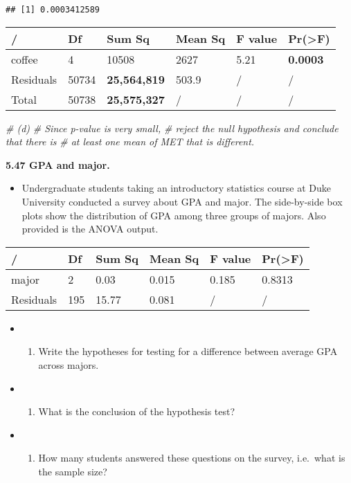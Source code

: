 \documentclass[]{book}
\newenvironment{Shaded}{\begin{snugshade}}{\end{snugshade}}
\newcommand{\CommentTok}[1]{\textcolor[rgb]{0.56,0.35,0.01}{\textit{#1}}}
\providecommand{\tightlist}{%
  \setlength{\itemsep}{0pt}\setlength{\parskip}{0pt}}
\begin{document}
\begin{verbatim}
## [1] 0.0003412589
\end{verbatim}

\begin{longtable}[]{@{}llllll@{}}
\toprule
/ & Df & Sum Sq & Mean Sq & F value & Pr(\textgreater{}F)\tabularnewline
\midrule
\endhead
coffee & 4 & 10508 & 2627 & 5.21 & \textbf{0.0003}\tabularnewline
Residuals & 50734 & \textbf{25,564,819} & 503.9 & / & /\tabularnewline
Total & 50738 & \textbf{25,575,327} & / & / & /\tabularnewline
\bottomrule
\end{longtable}

\begin{Shaded}
\begin{Highlighting}[]
\CommentTok{# (d)}
\CommentTok{# Since p-value is very small,}
\CommentTok{# reject the null hypothesis and conclude that there is}
\CommentTok{# at least one mean of MET that is different.}
\end{Highlighting}
\end{Shaded}

\textbf{5.47 GPA and major.}

\begin{itemize}
\tightlist
\item
  Undergraduate students taking an introductory statistics course at Duke University conducted a survey about GPA and major. The side-by-side box plots show the distribution of GPA among three groups of majors. Also provided is the ANOVA output.
\end{itemize}

\begin{longtable}[]{@{}llllll@{}}
\toprule
/ & Df & Sum Sq & Mean Sq & F value & Pr(\textgreater{}F)\tabularnewline
\midrule
\endhead
major & 2 & 0.03 & 0.015 & 0.185 & 0.8313\tabularnewline
Residuals & 195 & 15.77 & 0.081 & / & /\tabularnewline
\bottomrule
\end{longtable}

\begin{itemize}
\item
  \begin{enumerate}
  \def\labelenumi{(\alph{enumi})}
  \tightlist
  \item
    Write the hypotheses for testing for a difference between average GPA across majors.
  \end{enumerate}
\item
  \begin{enumerate}
  \def\labelenumi{(\alph{enumi})}
  \setcounter{enumi}{1}
  \tightlist
  \item
    What is the conclusion of the hypothesis test?
  \end{enumerate}
\item
  \begin{enumerate}
  \def\labelenumi{(\alph{enumi})}
  \setcounter{enumi}{2}
  \tightlist
  \item
    How many students answered these questions on the survey, i.e.~what is the sample size?
  \end{enumerate}
\end{itemize}
\end{document}
